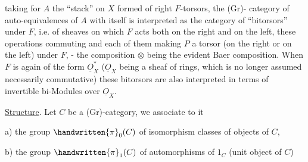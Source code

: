 
taking for $A$ the ``stack'' on $X$ formed of right $F$-torsors, the (Gr)- category of auto-equivalences of $A$ with itself is interpreted as the category of ``bitorsors'' under $F$, i.e. of sheaves  on which $F$ acts both on the right and on the left, these operations commuting and each of them making $P$ a torsor (on the right or on the left) under $F$, - the composition $\otimes$ being the evident Baer composition. When $F$ is again of the form $\underline{O}_{X}^{*}$ ($\underline{O}_{X}$ being a sheaf of rings, which is no longer assumed necessarily commutative) these bitorsors are also interpreted in terms of invertible bi-Modules over $\underline{O}_{X}$.

\uline{Structure}.  Let $C$ be a (Gr)-category, we associate to it

a) the group $\handwritten{\pi}_{0}(C)$ of isomorphism classes of objects of $C$,

b) the group $\handwritten{\pi}_{1}(C)$ of automorphisms of $1_C$ (unit object of $C$)

